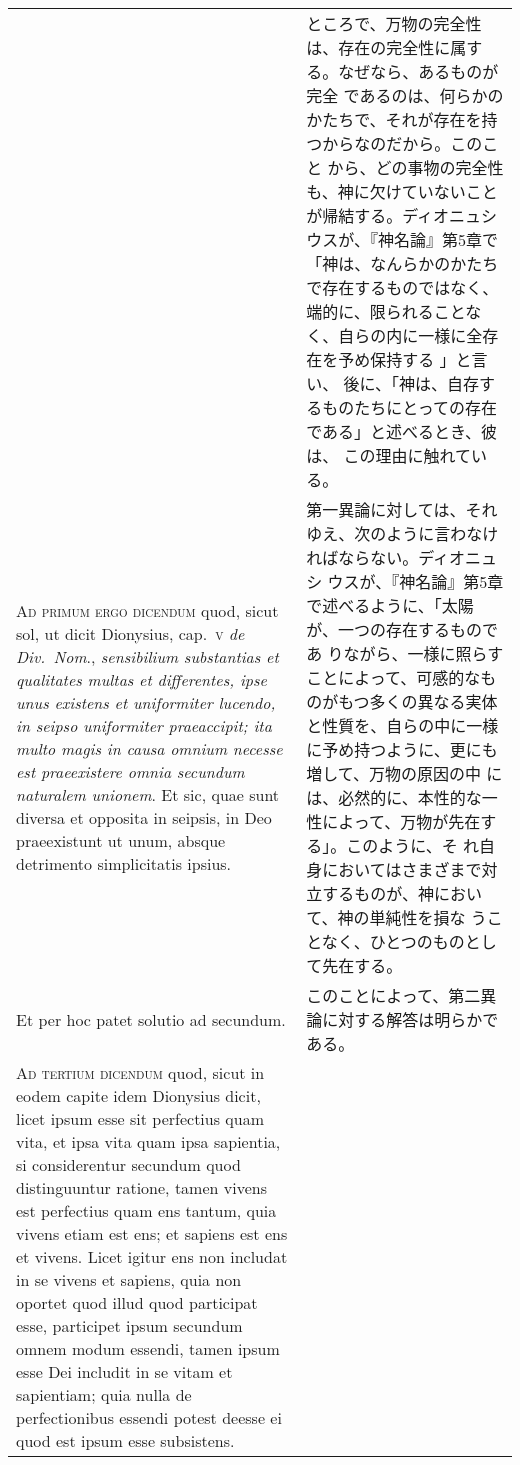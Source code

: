 \documentclass[10pt]{jsarticle} %
\begin{document}
\begin{longtable}{p{21em}p{21em}}
&

ところで、万物の完全性は、存在の完全性に属する。なぜなら、あるものが完全
 であるのは、何らかのかたちで、それが存在を持つからなのだから。このこと
 から、どの事物の完全性も、神に欠けていないことが帰結する。ディオニュシ
 ウスが、『神名論』第5章で「神は、なんらかのかたちで存在するものではなく、
 端的に、限られることなく、自らの内に一様に全存在を予め保持する 」と言い、
 後に、「神は、自存するものたちにとっての存在である」と述べるとき、彼は、
 この理由に触れている。

\\


{\scshape Ad primum ergo dicendum} quod, sicut sol, ut dicit Dionysius,
 cap.~{\scshape v} {\itshape de Div.~Nom}., {\itshape sensibilium substantias et
 qualitates multas et differentes, ipse unus existens et uniformiter
 lucendo, in seipso uniformiter praeaccipit; ita multo magis in causa
 omnium necesse est praeexistere omnia secundum naturalem unionem}. Et
 sic, quae sunt diversa et opposita in seipsis, in Deo praeexistunt ut
 unum, absque detrimento simplicitatis ipsius.

&

第一異論に対しては、それゆえ、次のように言わなければならない。ディオニュシ
 ウスが、『神名論』第5章で述べるように、「太陽が、一つの存在するものであ
 りながら、一様に照らすことによって、可感的なものがもつ多くの異なる実体
 と性質を、自らの中に一様に予め持つように、更にも増して、万物の原因の中
 には、必然的に、本性的な一性によって、万物が先在する」。このように、そ
 れ自身においてはさまざまで対立するものが、神において、神の単純性を損な
 うことなく、ひとつのものとして先在する。

\\



Et per hoc patet solutio ad secundum.
&
このことによって、第二異論に対する解答は明らかである。
\\

{\scshape Ad tertium dicendum} quod, sicut in eodem capite idem
 Dionysius dicit, licet ipsum esse sit perfectius quam vita, et ipsa
 vita quam ipsa sapientia, si considerentur secundum quod distinguuntur
 ratione, tamen vivens est perfectius quam ens tantum, quia vivens etiam
 est ens; et sapiens est ens et vivens. Licet igitur ens non includat in
 se vivens et sapiens, quia non oportet quod illud quod participat esse,
 participet ipsum secundum omnem modum essendi, tamen ipsum esse Dei
 includit in se vitam et sapientiam; quia nulla de perfectionibus
 essendi potest deesse ei quod est ipsum esse subsistens.


\end{longtable}
\end{document}
